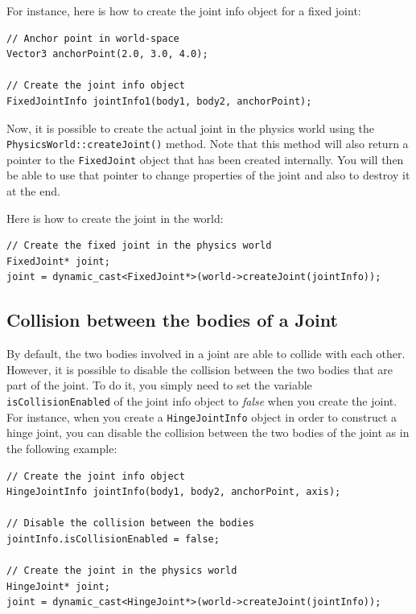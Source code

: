 \documentclass[a4paper,12pt]{article}
\begin{document}
    For instance, here is how to create the joint info object for a fixed joint: \\

    \begin{lstlisting}
// Anchor point in world-space
Vector3 anchorPoint(2.0, 3.0, 4.0);

// Create the joint info object
FixedJointInfo jointInfo1(body1, body2, anchorPoint);
  \end{lstlisting}

    \vspace{0.6cm}

    \begin{sloppypar}
    Now, it is possible to create the actual joint in the physics world using the \texttt{PhysicsWorld::createJoint()} method.
    Note that this method will also return a pointer to the \texttt{FixedJoint} object that has been created internally. You will then
    be able to use that pointer to change properties of the joint and also to destroy it at the end. \\
    \end{sloppypar}

    Here is how to create the joint in the world: \\

    \begin{lstlisting}
// Create the fixed joint in the physics world
FixedJoint* joint;
joint = dynamic_cast<FixedJoint*>(world->createJoint(jointInfo));
  \end{lstlisting}

    \subsection{Collision between the bodies of a Joint}

    By default, the two bodies involved in a joint are able to collide with each other. However, it is possible to disable the collision between the two bodies that are part
    of the joint. To do it, you simply need to set the variable \texttt{isCollisionEnabled} of the joint info object to \emph{false} when you create the joint. \\

    For instance, when you create a \texttt{HingeJointInfo} object in order to construct a hinge joint, you can disable the collision between the two bodies of the joint as in the
    following example: \\

    \begin{lstlisting}
// Create the joint info object
HingeJointInfo jointInfo(body1, body2, anchorPoint, axis);

// Disable the collision between the bodies
jointInfo.isCollisionEnabled = false;

// Create the joint in the physics world
HingeJoint* joint;
joint = dynamic_cast<HingeJoint*>(world->createJoint(jointInfo));
  \end{lstlisting}
\end{document}
